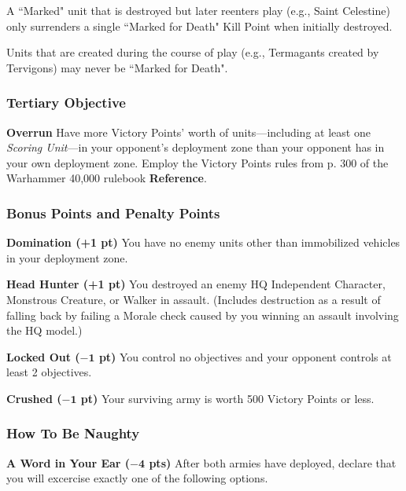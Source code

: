 \documentclass[12pt,titlepage]{article}
\newcommand{\paragraphsmall}[1]{\noindent\textbf{#1}\quad}
\begin{document}
{A ``Marked" unit that is destroyed but later reenters play (e.g., Saint Celestine) only surrenders a single ``Marked for Death" Kill Point when initially destroyed.

Units that are created during the course of play (e.g., Termagants created by Tervigons) may never be ``Marked for Death".

\vspace{-6pt}
\subsubsection*{Tertiary Objective}

\paragraphsmall{Overrun} Have more Victory Points' worth of units---including at least one \textit{Scoring Unit}---in your opponent's deployment zone than your opponent has in your own deployment zone. Employ the Victory Points rules from p. 300 of the Warhammer 40,000 rulebook \textbf{Reference}.

\vspace{-6pt}
\subsubsection*{Bonus Points and Penalty Points}

\paragraphsmall{Domination (+1 pt)} You have no enemy units other than immobilized vehicles in your deployment zone.

\vspace{4pt}
\paragraphsmall{Head Hunter (+1 pt)} You destroyed an enemy HQ Independent Character, Monstrous Creature, or Walker in assault. (Includes destruction as a result of falling back by failing a Morale check caused by you winning an assault involving the HQ model.)

\vspace{4pt}
\paragraphsmall{Locked Out ($\mathbf{-1}$ pt)} You control no objectives and your opponent controls at least 2 objectives.

\vspace{4pt}
\paragraphsmall{Crushed ($\mathbf{-1}$ pt)} Your surviving army is worth 500 Victory Points or less.

\subsubsection*{How To Be Naughty}

\paragraphsmall{A Word in Your Ear ($\mathbf{-4}$ pts)} After both armies have deployed, declare that you will excercise exactly one of the following options.

}
\end{document}
